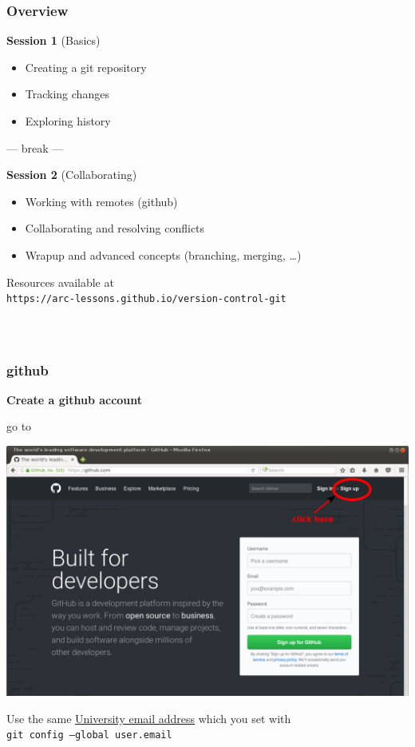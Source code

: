 \documentclass{beamer}
\begin{document}
\begin{frame}
  \frametitle{Overview}
  \textbf{\Large Session 1} (Basics) {\color{red}{13:40h - 15:00h}}
  \begin{itemize}
  \item Creating a git repository
  \item Tracking changes
  \item Exploring history
  \end{itemize}
  \vspace{-1ex}
  \begin{center}
  --- break ---
  \end{center}
  \vspace{-1ex}
  \textbf{\Large Session 2} (Collaborating) {\color{red}{15:30h - 17:00h}}
  \begin{itemize}
  \item Working with remotes (github)
  \item Collaborating and resolving conflicts
  \item Wrapup and advanced concepts (branching, merging, \dots)
  \end{itemize}
  \vspace{1ex}
  Resources available at\\[1ex]\texttt{https://arc-lessons.github.io/version-control-git}
\end{frame}


\begin{frame}
  \frametitle{${}^{}$}
\end{frame}


\begin{frame}
  \frametitle{github}
  \textbf{Create a github account}
  \begin{center}
    go to {}
  \end{center}
  \begin{center}
    \includegraphics[width=0.75\linewidth]{github.pdf}
  \end{center}
  Use the same \underline{University email address} which you set with\\
  \texttt{git config --global user.email}
\end{frame}
\end{document}
